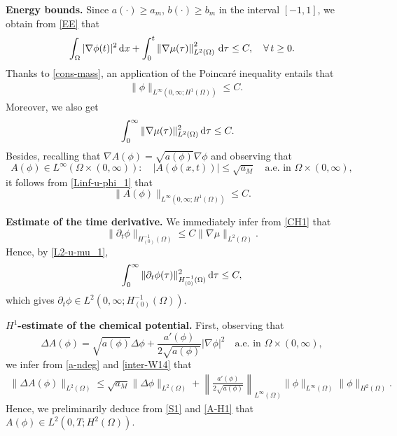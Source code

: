 \documentclass[11pt,reqno]{amsart}
\theoremstyle{remark}
\def\d{{\rm d}}
\numberwithin{equation}{section}
\def\d{{\rm d}}
\begin{document}
\smallskip
\textbf{Energy bounds.}
Since $a(\cdot) \geq a_m$, $b(\cdot)\geq b_m$ in the interval $[-1,1]$, we  obtain from \eqref{EE} that
\begin{equation*}
 \int_\Omega |\nabla \phi(t)|^2 \, \d x
+ \int_0^t \left\| \nabla \mu(\tau) \right\|_{L^2(\Omega)}^2 \, \d \tau \leq C, \quad \forall \, t \geq 0.
\end{equation*}
Thanks to \eqref{cons-mass}, an application of the Poincar\'{e} inequality entails that
\begin{align}
\label{Linf-u-phi_1}
&\| \phi\|_{L^\infty( 0,\infty; H^1(\Omega))} \leq C.
\end{align}
Moreover, we also get
\begin{align}
\label{L2-u-mu_1}
&\int_0^\infty \| \nabla \mu (\tau) \|_{L^2(\Omega)}^2 \, \d \tau \leq C.
\end{align}
Besides, recalling that $\nabla A(\phi)= \sqrt{a(\phi)}\nabla \phi$ and observing that
\begin{equation}
\label{A-Linfty}
A(\phi) \in L^{\infty}(\Omega\times (0,\infty)): \quad |A(\phi(x,t))|\leq  \sqrt{a_M}  \quad  \text{a.e. in }\Omega\times (0,\infty),
\end{equation}
it follows from \eqref{Linf-u-phi_1} that
\begin{equation}
\label{A-H1}
\| A(\phi)\|_{L^\infty( 0,\infty; H^1(\Omega))} \leq C.
\end{equation}

\medskip
\textbf{Estimate of the time derivative.} We immediately infer from \eqref{CH1} that
\begin{equation}
\label{est-phit-H-1}
\| \partial_t \phi\|_{ H^{-1}_{(0)}(\Omega)} \leq C \| \nabla \mu\|_{L^2(\Omega)}.
\end{equation}
Hence, by \eqref{L2-u-mu_1},
\begin{equation}
\label{phit-0inf}
\int_0^\infty \| \partial_t \phi (\tau)\|_{ H^{-1}_{(0)}(\Omega)}^2 \, \d \tau
\leq C,
\end{equation}
which gives $\partial_t \phi \in L^2(0,\infty;  H^{-1}_{(0)}(\Omega))$.
\medskip
\smallskip

\textbf{$H^1$-estimate of the chemical potential.} First, observing that
$$
\Delta A(\phi)= \sqrt{a(\phi)}\Delta \phi+ \frac{a'(\phi)}{2 \sqrt{a(\phi)}}|\nabla \phi|^2 \quad \text{a.e. in }\Omega\times (0,\infty),
$$
we infer from \eqref{a-ndeg} and \eqref{inter-W14} that
\begin{align*}
\| \Delta A(\phi)\|_{L^2(\Omega)} 
\leq \sqrt{a_M} \| \Delta \phi\|_{L^2(\Omega)} 
+ \left\| \frac{a'(\phi)}{2 \sqrt{a(\phi)}} \right\|_{L^\infty(\Omega)} \| \phi\|_{L^\infty(\Omega)}\| \phi\|_{H^2(\Omega)}.
\end{align*}
Hence, we preliminarily deduce from \eqref{S1} and \eqref{A-H1} that $A(\phi) \in L^2(0,T;H^2(\Omega))$. 
\smallskip
\end{document}
